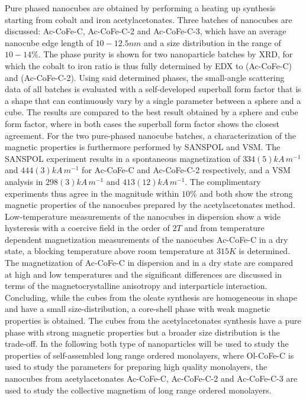 \documentclass[\main/dresen_thesis.tex]{subfiles}
\begin{document}
  Pure phased nanocubes are obtained by performing a heating up synthesis starting from cobalt and iron acetylacetonates.
  Three batches of nanocubes are discussed: Ac-CoFe-C, Ac-CoFe-C-2 and Ac-CoFe-C-3, which have an average nanocube edge length of $10 - 12.5 \unit{nm}$ and a size distribution in the range of $10 - 14 \%$.
  The phase purity is shown for two nanoparticle batches by XRD, for which the cobalt to iron ratio is thus fully determined by EDX to  (Ac-CoFe-C) and  (Ac-CoFe-C-2).
  Using said determined phases, the small-angle scattering data of all batches is evaluated with a self-developed superball form factor that is a shape that can continuously vary by a single parameter between a sphere and a cube.
  The results are compared to the best result obtained by a sphere and cube form factor, where in both cases the superball form factor shows the closest agreement.
  For the two pure-phased nanocube batches, a characterization of the magnetic properties is furthermore performed by SANSPOL and VSM.
  The SANSPOL experiment results in a spontaneous magnetization of $334(5) \unit{kA \, m^{-1}}$ and $444(3) \unit{kA \, m^{-1}}$ for Ac-CoFe-C and Ac-CoFe-C-2 respectively, and a VSM analysis in $298(3) \unit{kA \, m^{-1}}$ and $413(12) \unit{kA \, m^{-1}}$.
  The complimentary experiments thus agree in the magnitude within $10 \%$ and both show the strong magnetic properties of the nanocubes prepared by the acetylacetonates method.
  Low-temperature measurements of the nanocubes in dispersion show a wide hysteresis with a coercive field in the order of $2 \unit{T}$ and from temperature dependent magnetization measurements of the nanocubes Ac-CoFe-C in a dry state, a blocking temperature above room temperature at $315 \unit{K}$ is determined.
  The magnetization of Ac-CoFe-C in dispersion and in a dry state are compared at high and low temperatures and the significant differences are discussed in terms of the magnetocrystalline anisotropy and interparticle interaction.
  \\

  Concluding, while the cubes from the oleate synthesis are homogeneous in shape and have a small size-distribution, a core-shell phase with weak magnetic properties is obtained.
  The cubes from the acetylacetonates synthesis have a pure phase with strong magnetic properties but a broader size distribution is the trade-off.
  In the following both type of nanoparticles will be used to study the properties of self-assembled long range ordered monolayers, where Ol-CoFe-C is used to study the parameters for preparing high quality monolayers, the nanocubes from acetylacetonates Ac-CoFe-C, Ac-CoFe-C-2 and Ac-CoFe-C-3 are used to study the collective magnetism of long range ordered monolayers.
\end{document}

